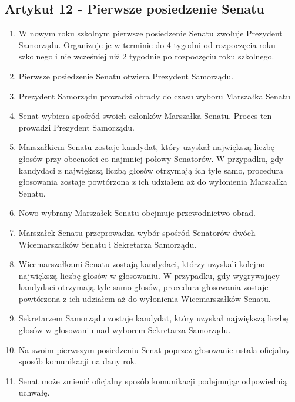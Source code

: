 \documentclass[14pt]{article}
\newenvironment{ustepy}{%
	\begin{enumerate}[leftmargin=1.5em, itemindent=1pt, labelwidth=1em, itemsep=5pt]
	}{%
	\end{enumerate}
}
\begin{document}
\subsection*{Artykuł 12 - Pierwsze posiedzenie Senatu}
\begin{ustepy}
	\item W nowym roku szkolnym pierwsze posiedzenie Senatu zwołuje Prezydent Samorządu. Organizuje je w terminie do 4 tygodni od rozpoczęcia roku szkolnego i nie wcześniej niż 2 tygodnie po rozpoczęciu roku szkolnego.
	\item Pierwsze posiedzenie Senatu otwiera Prezydent Samorządu.
	\item Prezydent Samorządu prowadzi obrady do czasu wyboru Marszałka Senatu
	\item Senat wybiera spośród swoich członków Marszałka Senatu. Proces ten prowadzi Prezydent Samorządu.
	\item Marszałkiem Senatu zostaje kandydat, który uzyskał największą liczbę głosów przy obecności co najmniej połowy Senatorów. W przypadku, gdy kandydaci z największą liczbą głosów otrzymają ich tyle samo, procedura głosowania zostaje powtórzona z ich udziałem aż do wyłonienia Marszałka Senatu. 
	\item Nowo wybrany Marszałek Senatu obejmuje przewodnictwo obrad.
	\item Marszałek Senatu przeprowadza wybór spośród Senatorów dwóch Wicemarszałków Senatu i Sekretarza Samorządu.
	\item Wicemarszałkami Senatu zostają kandydaci, którzy uzyskali kolejno największą liczbę głosów w głosowaniu. W przypadku, gdy wygrywający kandydaci otrzymają tyle samo głosów, procedura głosowania zostaje powtórzona z ich udziałem aż do wyłonienia Wicemarszałków Senatu. 
	\item Sekretarzem Samorządu zostaje kandydat, który uzyskał największą liczbę głosów w głosowaniu nad wyborem Sekretarza Samorządu.
	\item Na swoim pierwszym posiedzeniu Senat poprzez głosowanie ustala oficjalny sposób komunikacji na dany rok. 
	\item Senat może zmienić oficjalny sposób komunikacji podejmując odpowiednią uchwałę.
\end{ustepy}
\end{document}
